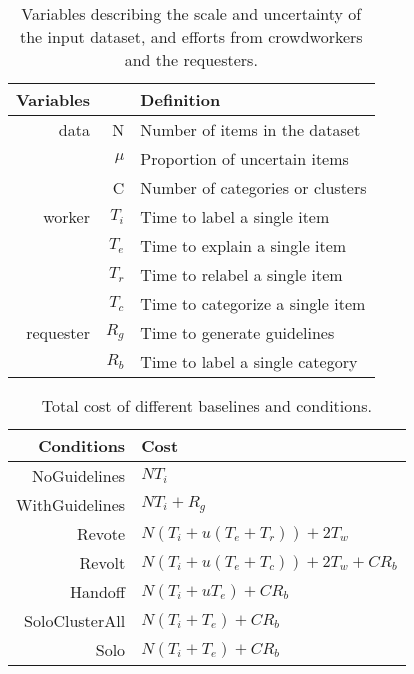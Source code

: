 \begin{table}
\centering
\begin{tabular}{r r l}
     Variables &  & Definition \\
     \hline
     data & N  & Number of items in the dataset \\
     & $\mu$ & Proportion of uncertain items \\
     & C & Number of categories or clusters \\
     
     worker & $T_i$  & Time to label a single item \\
     & $T_e$ & Time to explain a single item \\
     & $T_r$ & Time to relabel a single item \\
     & $T_c$ & Time to categorize a single item \\
     requester & $R_g$  & Time to generate guidelines \\
     & $R_b$ & Time to label a single category 
\end{tabular}
\caption{Variables describing the scale and uncertainty of the input dataset, and efforts from crowdworkers and the requesters.}
\label{tab:costVars}
\end{table}


\begin{table}
\centering
\begin{tabular}{r l}
     Conditions & Cost \\
     \hline
     NoGuidelines & $N T_i$ \\
     WithGuidelines & $N T_i + R_g$ \\
     Revote & $N (T_i+u(T_e+T_r)) + 2T_w$ \\
     Revolt & $N (T_i+u(T_e+T_c))+2T_w+CR_b$ \\
     Handoff & $N (T_i+uT_e)+CR_b$ \\
     SoloClusterAll & $N (T_i+T_e)+CR_b$ \\
     Solo & $N (T_i+T_e)+CR_b$ \\
\end{tabular}
\caption{Total cost of different baselines and conditions.}
\label{tab:costConds}
\end{table}


